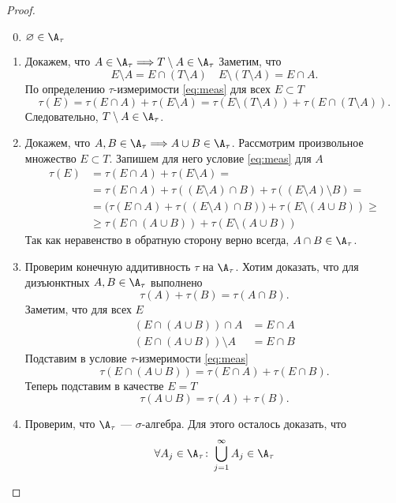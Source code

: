 \begin{proof}
	$ $
    \begin{enumerate}
		\setcounter{enumi}{-1}
		\item $ \varnothing \in  \A_{\tau }$
        \item Докажем, что $ A \in \A_{\tau } \Longrightarrow T\setminus A \in \A_{\tau }$
			Заметим, что
			\[
				E \setminus A = E \cap (T \setminus A) \quad E \setminus (T \setminus A) = E \cap A
			.\] 
			По определению $ \tau $-измеримости \ref{eq:meas} для всех $ E \subset T$
			\[
				\tau (E) = \tau (E \cap A) + \tau (E \setminus A) = \tau (E \setminus (T\setminus A)) + \tau (E \cap (T \setminus A))
			.\] 
			Следовательно, $ T \setminus A \in \A_{\tau }$.
		\item Докажем, что $ A, B \in \A_{\tau } \Longrightarrow A \cup B \in \A_{\tau }$.
			Рассмотрим произвольное множество $ E \subset T$. Запишем для него условие \ref{eq:meas} для $ A$
			\[
			\begin{aligned}
				\tau (E) &= \tau (E \cap A) + \tau (E \setminus A) = \\
						 &= \tau (E \cap A) + \tau ((E\setminus A) \cap B) + \tau ((E\setminus A)\setminus B) = \\
						 &= \bigl(\tau (E \cap A) + \tau ((E\setminus A)\cap B)\bigr) + \tau (E \setminus (A\cup B)) \ge \\
						 & \ge \tau (E \cap (A\cup B)) + \tau (E \setminus (A\cup B))
			\end{aligned}
			\]
			Так как неравенство в обратную сторону верно всегда, $ A\cap B \in \A_{\tau }$. 
		\item Проверим конечную аддитивность $ \tau $ на $ \A_{\tau }$. Хотим доказать, что для дизъюнктных $ A, B \in \A_{\tau }$ выполнено
			\[
				\tau (A) + \tau (B) = \tau (A \cap B)
			.\] 
			Заметим, что для всех $ E$
			\[
			\begin{aligned}
				(E \cap (A \cup B)) \cap A &= E \cap A \\
				(E \cap (A \cup B)) \setminus A &= E\cap B
			\end{aligned}
			\]
			Подставим в условие $ \tau $-измеримости \ref{eq:meas}
			\[
				\tau (E \cap (A \cup B)) = \tau (E \cap A) + \tau (E \cap B)
			.\] 
			Теперь подставим в качестве $ E = T$ 
			\[
				\tau (A \cup B) = \tau (A) + \tau (B)
			.\] 
		\item Проверим, что $ \A_{\tau }$ --- $ \sigma $-алгебра. Для этого осталось доказать, что 
			\[
			\forall A_j \in \A_{\tau } \colon \bigcup_{j=1}^{\infty} A_j \in \A_{\tau }
\]
\end{enumerate}
\end{proof}
